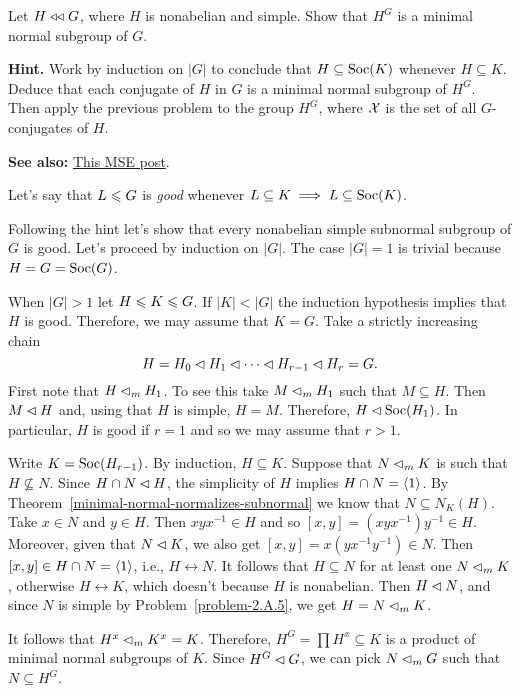 \begin{probl}
    Let\/ $H\mathrel{\triangleleft\triangleleft} G$, where\/ $H$ is nonabelian and simple. Show that\/ $H^G$ is a minimal normal subgroup of\/ $G$.

    \textrm{\rm\textbf{Hint.} Work by induction on $|G|$ to conclude that $H\subseteq {\rm Soc}(K)$ whenever $H\subseteq K$. Deduce that each conjugate of $H$ in $G$ is a minimal normal subgroup of $H^G$. Then apply the previous problem to the group $H^G$, where $\cal X$ is the set of all $G$-conjugates of $H$.}

    \textrm{\rm\textbf{See also:} \href{https://math.stackexchange.com/a/2368182/269050}{This MSE post}}.
\end{probl}

\begin{solution} Let's say that $L\leqslant G$ is \textsl{good} whenever $L\subseteq K\implies L\subseteq{\rm Soc}(K)$. 

Following the hint let's show that every nonabelian simple subnormal subgroup of $G$ is good. Let's proceed by induction on $|G|$. The case $|G|=1$ is trivial because $H=G={\rm Soc}(G)$.

When $|G|>1$ let $H\leqslant K\leqslant G$. If $|K|<|G|$ the induction hypothesis implies that $H$ is good. Therefore, we may assume that $K=G$. Take a strictly increasing chain
$$
    H = H_0\lhd H_1\lhd\cdots\lhd H_{r-1}\lhd H_r=G.
$$
First note that $H\lhd_mH_1$. To see this take $M\lhd_mH_1$ such that $M\subseteq H$. Then $M\lhd H$ and, using that $H$ is simple, $H=M$. Therefore, $H\lhd{\rm Soc}(H_1)$. In particular, $H$ is good if $r=1$ and so we may assume that $r>1$.

Write $K={\rm Soc}(H_{r-1})$. By induction, $H\subseteq K$. Suppose that $N\lhd_m K$ is such that $H\not\subseteq N$. Since $H\cap N\lhd H$, the simplicity of $H$ implies $H\cap N=\langle1\rangle$. By Theorem~\ref{minimal-normal-normalizes-subnormal} we know that $N\subseteq N_K(H)$. Take $x\in N$ and $y\in H$. Then $xyx^{-1}\in H$ and so $[x,y]=(xyx^{-1})y^{-1}\in H$. Moreover, given that $N\lhd K$, we also get $[x,y]=x(yx^{-1}y^{-1})\in N$. Then $[x,y]\in H\cap N=\langle1\rangle$, i.e., $H\leftrightarrow N$. It follows that $H\subseteq N$ for at least one $N\lhd_mK$, otherwise $H\leftrightarrow K$, which doesn't because $H$ is nonabelian. Then $H\lhd N$, and since $N$ is simple by Problem~\ref{problem-2.A.5}, we get $H=N\lhd_mK$.

It follows that $H^x\lhd_mK^x=K$. Therefore, $H^G=\prod H^x\subseteq K$ is a product of minimal normal subgroups of $K$. Since $H^G\lhd G$, we can pick $N\lhd_mG$ such that $N\subseteq H^G$.


\end{solution}
